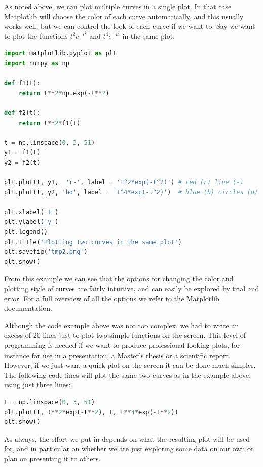 \documentclass[graybox,envcountchap,sectrefs,final]{svmonodo}
\begin{document}
\vspace{6mm}



As noted above, we can plot multiple curves in a single plot. In that case Matplotlib will choose the color of
each curve automatically, and this usually works well, but we can control the look of each curve if
we want to. Say we want to plot the functions $t^2e^{-t^2}$ and $t^4e^{-t^2}$ in the same plot:
\begin{lstlisting}[language=Python,style=blue1]
import matplotlib.pyplot as plt
import numpy as np

def f1(t):
    return t**2*np.exp(-t**2)

def f2(t):
    return t**2*f1(t)

t = np.linspace(0, 3, 51)
y1 = f1(t)
y2 = f2(t)

plt.plot(t, y1,  'r-', label = 't^2*exp(-t^2)') # red (r) line (-)
plt.plot(t, y2, 'bo', label = 't^4*exp(-t^2)')  # blue (b) circles (o)

plt.xlabel('t')
plt.ylabel('y')
plt.legend()
plt.title('Plotting two curves in the same plot')
plt.savefig('tmp2.png')
plt.show()
\end{lstlisting}
From this example we can see that the options for changing the color and plotting style of curves are
fairly intuitive, and can easily be explored by trial and error. For a full overview of
all the options we refer to the Matplotlib documentation.

Although the code example above was not too complex, we had to write an excess of 20 lines just to plot two simple
functions on the screen. This level of programming is needed if we want to produce professional-looking plots,
for instance for use in a presentation, a Master's thesis or a scientific report. However, if we just want a
quick plot on the screen it can be done much simpler. The following code lines will plot the same two curves as in the
example above, using just three lines:
\begin{lstlisting}[language=Python,style=blue1]
t = np.linspace(0, 3, 51)
plt.plot(t, t**2*exp(-t**2), t, t**4*exp(-t**2))
plt.show()
\end{lstlisting}
As always, the effort we put in depends on what the resulting plot will be used for, and in particular on
whether we are just exploring some data on our own or plan on presenting it to others.
\end{document}
